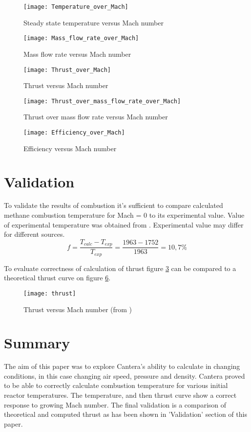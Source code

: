 \documentclass[a4paper, 12pt]{article}
\begin{document}
\begin{figure}
\centering
\texttt{[image: Temperature\_over\_Mach]}
\caption{Steady state temperature versus Mach number}
\label{fig:temp}
\end{figure}

\begin{figure}
\centering
\texttt{[image: Mass\_flow\_rate\_over\_Mach]}
\caption{Mass flow rate versus Mach number}
\label{fig:mass}
\end{figure}

\begin{figure}
\centering
\texttt{[image: Thrust\_over\_Mach]}
\caption{Thrust versus Mach number}
\label{fig:thrust}
\end{figure}

\begin{figure}
\centering
\texttt{[image: Thrust\_over\_mass\_flow\_rate\_over\_Mach]}
\caption{Thrust over mass flow rate versus Mach number}
\label{fig:thrustm}
\end{figure}

\begin{figure}
\centering
\texttt{[image: Efficiency\_over\_Mach]}
\caption{Efficiency versus Mach number}
\label{fig:eff}
\end{figure}

\section{Validation}

To validate the results of combustion it's sufficient to compare calculated methane combustion temperature for Mach = 0 to its experimental value. Value of experimental temperature was obtained from \cite{one}. Experimental value may differ for different sources.
\[f = \frac{T_{calc}-T_{exp}}{T_{exp}} = \frac{1963-1752}{1963} = 10,7 \%\]

To evaluate correctness of calculation of thrust figure \ref{fig:thrust} can be compared to a theoretical thrust curve on figure \ref{fig:teor}.

\begin{figure}
\centering
\texttt{[image: thrust]}
\caption{Thrust versus Mach number (from \cite{two}) }
\label{fig:teor}
\end{figure}

\section{Summary}
The aim of this paper was to explore Cantera's ability to calculate in changing conditions, in this case changing air speed, pressure and density. Cantera proved to be able to correctly calculate combustion temperature for various initial reactor temperatures. The temperature, and then thrust curve show a correct response to growing Mach number.  The final validation is a comparison of theoretical and computed thrust as has been shown in 'Validation' section of this paper.
\end{document}
